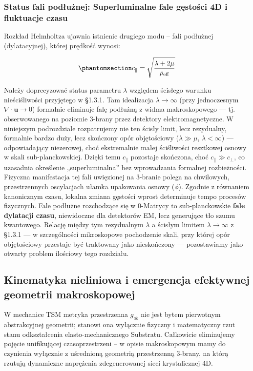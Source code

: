 \documentclass[
  polish,
  letterpaper,
  DIV=11,
  numbers=noendperiod,
  oneside]{scrartcl}
\begin{document}
\subsubsection{Status fali podłużnej: Superluminalne fale gęstości 4D i
fluktuacje czasu}\label{sec-1-3-6}

Rozkład Helmholtza ujawnia istnienie drugiego modu -- fali podłużnej
(dylatacyjnej), której prędkość wynosi:

\begin{equation}\protect\phantomsection\label{eq-1-3-predk-fali-podluz}{c_{\parallel} = \sqrt{\frac{\lambda + 2\mu}{\rho_{\text{eff}}}}}\end{equation}

Należy doprecyzować status parametru \(\lambda\) względem ścisłego
warunku nieściśliwości przyjętego w §1.3.1. Tam idealizacja
\(\lambda\to\infty\) (przy jednoczesnym \(\nabla\cdot\mathbf{u}\to0\))
formalnie eliminuje falę podłużną z widma makroskopowego --- tj.
obserwowanego na poziomie 3-brany przez detektory elektromagnetyczne. W
niniejszym podrozdziale rozpatrujemy nie ten ścisły limit, lecz
rezydualny, formalnie bardzo duży, lecz skończony opór objętościowy
(\(\lambda\gg\mu\), \(\lambda<\infty\)) --- odpowiadający niezerowej,
choć ekstremalnie małej ściśliwości resztkowej osnowy w skali
sub-planckowskiej. Dzięki temu \(c_\parallel\) pozostaje skończona, choć
\(c_\parallel\gg c_\perp\), co uzasadnia określenie „superluminalna''
bez wprowadzania formalnej rozbieżności. Fizyczna manifestacja tej fali
uwięzionej na 3-branie polega na chwilowych, przestrzennych oscylacjach
ułamka upakowania osnowy (\(\phi\)). Zgodnie z równaniem kanonicznym
czasu, lokalna zmiana gęstości wprost determinuje tempo procesów
fizycznych. Fale podłużne rozchodzące się w 0-Matrycy to
sub-planckowskie \textbf{fale dylatacji czasu}, niewidoczne dla
detektorów EM, lecz generujące tło szumu kwantowego. Relację między tym
rezydualnym \(\lambda\) a ścisłym limitem \(\lambda\to\infty\) z §1.3.1
--- w szczególności mikroskopowe pochodzenie skali, przy której opór
objętościowy przestaje być traktowany jako nieskończony --- pozostawiamy
jako otwarty problem ilościowy tego rozdziału.

\subsection{Kinematyka nieliniowa i emergencja efektywnej geometrii
makroskopowej}\label{sec-1-4}

W mechanice TSM metryka przestrzenna \(g_{ab}\) nie jest bytem
pierwotnym abstrakcyjnej geometrii; stanowi ona wyłącznie fizyczny i
matematyczny rzut stanu odkształcenia elasto-mechanicznego Substratu.
Całkowicie eliminujemy pojęcie unifikującej czasoprzestrzeni -- w opisie
makroskopowym mamy do czynienia wyłącznie z uśrednioną geometrią
przestrzenną 3-brany, na którą rzutują dynamiczne naprężenia
zdegenerowanej sieci krystalicznej 4D.
\end{document}
